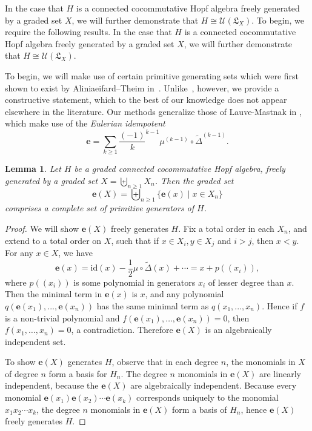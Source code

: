\documentclass[11pt]{amsart}
\newtheorem{lemma}[theorem]{Lemma}
\theoremstyle{definition}
\numberwithin{equation}{section}
\newcommand{\lucas}[1]{\todo[size=\tiny,color=red!50]{#1 \\ \hfill --- Lucas}}
\begin{document}
In the case that $H$ is a connected cocommutative Hopf algebra freely generated by a graded set $X$, 
we will further demonstrate that $H\cong \mathcal{U}(\mathfrak{L}_X).$ To begin, we require the following results.
In the case that $H$ is a connected cocommutative Hopf algebra freely generated by a graded set $X$, we will further demonstrate that $H\cong \mathcal{U}(\mathfrak{L}_X).$

To begin, we will make use of certain primitive generating sets which were first shown to exist by Aliniaeifard--Theim in~\cite[Lemma 11]{AT22}.  
Unlike~\cite{AT22}, however, we provide a constructive statement, which to the best of our knowledge does not appear elsewhere in the literature.\lucas{Really double-check this}  
Our methods generalize those of Lauve-Mastnak in \cite{LM11}, which make use of the \emph{Eulerian idempotent}
\[
\mathbf{e} = \sum_{k \geq 1}\frac{(-1)}{k}^{k-1} \mu^{(k-1)} \circ \tilde{\Delta}^{(k-1)}.
\]

\begin{lemma}
\label{lemma:primitive generators}
    Let $H$ be a graded connected cocommutative Hopf algebra, freely generated by a graded set $X=\biguplus_{n \geq 1}X_n$.  Then the graded set
\[
\mathbf{e}(X) = \biguplus_{n \ge 1} \{\mathbf{e}(x) \;|\; x \in X_{n}\}
\]
comprises a complete set of primitive generators of $H$.
\end{lemma}
\begin{proof}
We will show $\mathbf{e}(X)$ freely generates $H$. Fix a total order in each $X_n$, and extend to a total order on $X$, such that if $x\in X_i, y\in X_j$ and $i>j$, then $x<y$. For any $x\in X$, we have
\[
\mathbf{e}(x) = \text{id} (x) - \frac{1}{2}\mu \circ \tilde{\Delta}(x) + \cdots = x + p((x_i)),
\]
where $p((x_i))$ is some polynomial in generators $x_i$ of lesser degree than $x$. Then the minimal term in $\mathbf{e}(x)$ is $x$, and any polynomial $q(\mathbf{e}(x_1),...,\mathbf{e}(x_n))$ has the same minimal term as $q(x_1,...,x_n)$. Hence if $f$ is a non-trivial polynomial and $f(\mathbf{e}(x_1), \ldots, \mathbf{e}(x_n)) = 0$, then $f(x_1, \ldots, x_n) = 0$, a contradiction. Therefore $\mathbf{e}(X)$ is an algebraically independent set.

    To show $\mathbf{e}(X)$ generates $H$, observe that in each degree $n$, the monomials in $X$ of degree $n$ form a basis for $H_n$. The degree $n$ monomials in $\mathbf{e}(X)$ are linearly independent, because the $\mathbf{e}(X)$ are algebraically independent. Because every monomial $\mathbf{e}(x_1)\mathbf{e}(x_2)\cdots \mathbf{e}(x_k)$ corresponds uniquely to the monomial $x_1x_2 \cdots x_k$, the degree $n$ monomials in $\mathbf{e}(X)$ form a basis of $H_n$, hence $\mathbf{e}(X)$ freely generates $H$.
\end{proof}
\end{document}
